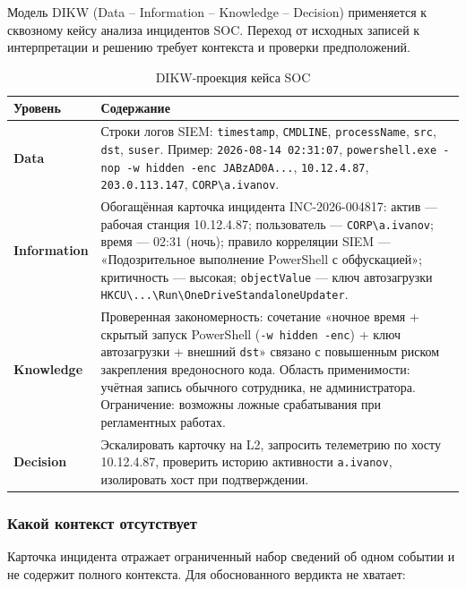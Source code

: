 \documentclass[12pt]{extreport}
\begin{document}
	Модель DIKW (Data -- Information -- Knowledge -- Decision) применяется к сквозному кейсу анализа инцидентов SOC. Переход от исходных записей к интерпретации и решению требует контекста и проверки предположений.
	
	\begin{table}[H]
		\centering
		\caption{DIKW-проекция кейса SOC}
		\begin{tabular}{@{}p{2.5cm}p{11cm}@{}}
			\toprule
			Уровень & Содержание \\
			\midrule
			\textbf{Data} & Строки логов SIEM: \texttt{timestamp}, \texttt{CMDLINE}, \texttt{processName}, \texttt{src}, \texttt{dst}, \texttt{suser}. Пример: \texttt{2026-08-14 02:31:07}, \texttt{powershell.exe -nop -w hidden -enc JABzAD0A...}, \texttt{10.12.4.87}, \texttt{203.0.113.147}, \texttt{CORP\textbackslash a.ivanov}. \\
			\textbf{Information} & Обогащённая карточка инцидента INC-2026-004817: актив --- рабочая станция 10.12.4.87; пользователь --- \texttt{CORP\textbackslash a.ivanov}; время --- 02:31 (ночь); правило корреляции SIEM --- «Подозрительное выполнение PowerShell с обфускацией»; критичность --- высокая; \texttt{objectValue} --- ключ автозагрузки \texttt{HKCU\textbackslash...\textbackslash Run\textbackslash OneDriveStandaloneUpdater}. \\
			\textbf{Knowledge} & Проверенная закономерность: сочетание «ночное время + скрытый запуск PowerShell (\texttt{-w hidden -enc}) + ключ автозагрузки + внешний \texttt{dst}» связано с повышенным риском закрепления вредоносного кода. Область применимости: учётная запись обычного сотрудника, не администратора. Ограничение: возможны ложные срабатывания при регламентных работах. \\
			\textbf{Decision} & Эскалировать карточку на L2, запросить телеметрию по хосту 10.12.4.87, проверить историю активности \texttt{a.ivanov}, изолировать хост при подтверждении. \\
			\bottomrule
		\end{tabular}
	\end{table}
	
	\subsubsection{Какой контекст отсутствует}
	
	Карточка инцидента отражает ограниченный набор сведений об одном событии и не содержит полного контекста. Для обоснованного вердикта не хватает:
	
\end{document}
